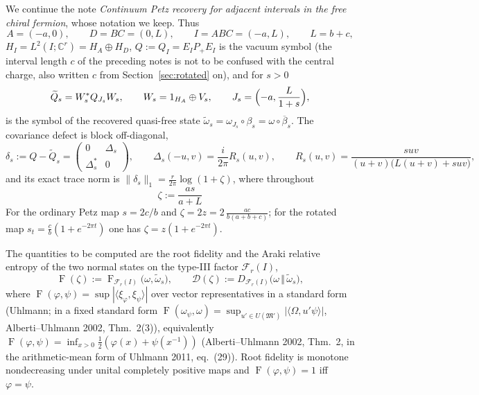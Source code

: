 \documentclass[11pt]{article}
\theoremstyle{accent}
\theoremstyle{definition}
\newcommand{\cF}{\mathcal{F}}
\newcommand{\cM}{\mathfrak{M}}
\newcommand{\Fid}{\operatorname{F}}
\begin{document}
We continue the note \emph{Continuum Petz recovery for adjacent intervals in the free chiral fermion}, whose notation we keep.  Thus
\[
 A=(-a,0),\qquad D=BC=(0,L),\qquad I=ABC=(-a,L),\qquad L=b+c,
\]
\(H_I=L^2(I;\mathbb C^r)=H_A\oplus H_D\), \(Q:=Q_I=E_IP_+E_I\) is the vacuum symbol (the interval length \(c\) of the preceding notes is not to be confused with the central charge, also written \(c\) from Section~\ref{sec:rotated} on), and for \(s>0\)
\begin{equation}\label{eq:Qt-def}
 \widetilde Q_s=W_s^*Q_{J_s}W_s,\qquad W_s=1_{H_A}\oplus V_s,\qquad J_s=\Bigl(-a,\frac{L}{1+s}\Bigr),
\end{equation}
is the symbol of the recovered quasi-free state \(\widetilde\omega_s=\omega_{J_s}\circ\beta_s=\omega\circ\overline\beta_s\).  The covariance defect is block off-diagonal,
\begin{equation}\label{eq:defect-recall}
 \delta_s:=Q-\widetilde Q_s=\begin{pmatrix}0&\Delta_s\\ \Delta_s^*&0\end{pmatrix},
 \qquad
 \Delta_s(-u,v)=\frac{i}{2\pi}R_s(u,v),\qquad
 R_s(u,v)=\frac{suv}{(u+v)\bigl(L(u+v)+suv\bigr)},
\end{equation}
and its exact trace norm is \(\|\delta_s\|_1=\frac r{2\pi}\log(1+\zeta)\), where throughout
\begin{equation}\label{eq:zeta}
 \boxed{\;\zeta:=\frac{as}{a+L}\;}
\end{equation}
For the ordinary Petz map \(s=2c/b\) and \(\zeta=2z=2\,\frac{ac}{b(a+b+c)}\); for the rotated map \(s_t=\frac cb(1+e^{-2\pi t})\) one has \(\zeta=z(1+e^{-2\pi t})\).

The quantities to be computed are the root fidelity and the Araki relative entropy of the two normal states on the type-III factor \(\cF_r(I)\),
\begin{equation}\label{eq:targets}
 \Fid(\zeta):=\Fid_{\cF_r(I)}\bigl(\omega,\widetilde\omega_s\bigr),
 \qquad
 \mathcal D(\zeta):=D_{\cF_r(I)}\bigl(\omega\,\Vert\,\widetilde\omega_s\bigr),
\end{equation}
where \(\Fid(\varphi,\psi)=\sup|\langle\xi_\varphi,\xi_\psi\rangle|\) over vector representatives in a standard form (Uhlmann; in a fixed standard form \(\Fid(\omega_\psi,\omega)=\sup_{u'\in U(\cM')}|\langle\Omega,u'\psi\rangle|\), Alberti--Uhlmann 2002, Thm.~2(3)), equivalently \(\Fid(\varphi,\psi)=\inf_{x>0}\frac12(\varphi(x)+\psi(x^{-1}))\) (Alberti--Uhlmann 2002, Thm.~2, in the arithmetic-mean form of Uhlmann 2011, eq.~(29)).  Root fidelity is monotone nondecreasing under unital completely positive maps and \(\Fid(\varphi,\psi)=1\) iff \(\varphi=\psi\).
\end{document}
